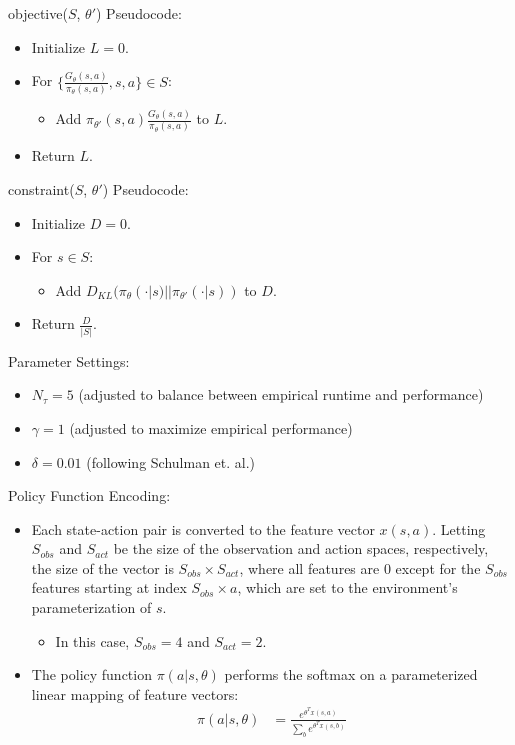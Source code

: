 \documentclass[a4paper]{article}
\begin{document}
objective($S$, $\theta'$) Pseudocode:
\begin{itemize}
    \item Initialize $L = 0$.
    \item For $\{\frac{G_{\theta}(s, a)}
            {\pi_{\theta}(s, a)}, s, a\} \in S$:
    \begin{itemize}
        \item Add $\pi_{\theta'}(s, a) 
            \frac{G_{\theta}(s, a)} {\pi_{\theta}(s, a)}$ to $L$.
    \end{itemize}
    \item Return $L$.
\end{itemize}
constraint($S$, $\theta'$) Pseudocode:
\begin{itemize}
    \item Initialize $D = 0$.
    \item For $s \in S$:
    \begin{itemize}
        \item Add $D_{KL}(\pi_{\theta}(\cdot | s) 
            || \pi_{\theta'}(\cdot | s))$ to $D$.
    \end{itemize}
    \item Return $\frac{D}{|S|}$.
\end{itemize}
Parameter Settings:
\begin{itemize}
    \item $N_{\tau} = 5$ (adjusted to balance between empirical runtime and
        performance)
    \item $\gamma = 1$ (adjusted to maximize empirical performance)
    \item $\delta = 0.01$ (following Schulman et. al.)
\end{itemize}
Policy Function Encoding:
\begin{itemize}
    \item Each state-action pair is converted to the feature vector $x(s, a)$.
        Letting $S_{obs}$ and $S_{act}$ be the size of the observation and
        action spaces, respectively, the size of the vector is $S_{obs} \times
        S_{act}$, where all features are $0$ except for the $S_{obs}$ features
        starting at index $S_{obs} \times a$, which are set to the
        environment's parameterization of $s$.
    \begin{itemize}
        \item In this case, $S_{obs} = 4$ and $S_{act} = 2$.
    \end{itemize}
    \item The policy function $\pi(a | s, \theta)$ performs the softmax on a
        parameterized linear mapping of feature vectors:
        \begin{align*}
            \pi(a | s, \theta) &= \frac{e^{\theta^T x(s, a)}}
            {\sum_{b} e^{\theta^T x(s, b)}}\\
        \end{align*}
\end{itemize}
\end{document}
